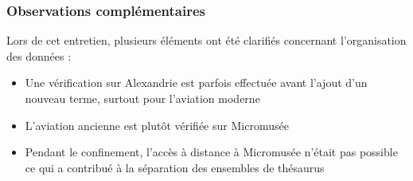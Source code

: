 

\subsubsection*{Observations complémentaires}

Lors de cet entretien, plusieurs éléments ont été clarifiés concernant l'organisation des données :
\begin{itemize}
	\item Une vérification sur Alexandrie est parfois effectuée avant l'ajout d'un nouveau terme, surtout pour l'aviation moderne
	\item L'aviation ancienne est plutôt vérifiée sur Micromusée
	\item Pendant le confinement, l'accès à distance à Micromusée n'était pas possible ce qui a contribué à la séparation des ensembles de thésaurus
\end{itemize}